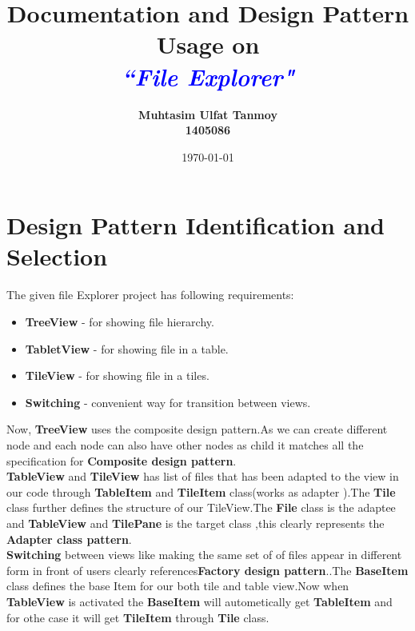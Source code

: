 \documentclass[10pt]{article}
\newcommand{\blueIt}[1]{\itshape \textcolor{blue}{#1}}
\begin{document}
\title{\bfseries \Huge Documentation and Design Pattern Usage on\\
\blueIt{``File Explorer"}}

\author{\bfseries Muhtasim Ulfat Tanmoy\\
1405086}
\date{\today}

\maketitle


\newpage

\section {Design Pattern Identification and Selection}

The given file Explorer project has following requirements:

\begin{itemize} %
 \item {\bfseries TreeView } - for showing file hierarchy.
 \item {\bfseries TabletView } - for showing file in a table.
  \item {\bfseries TileView } - for showing file in a tiles.
  \item {\bfseries Switching } - convenient way for transition between views.
 \end{itemize}
 
 Now, {\bfseries TreeView } uses the composite design pattern.As we can create different node and each node can also have other nodes as child it matches all the specification for {\bfseries Composite design pattern}.\\
 
 {\bfseries TableView } and {\bfseries TileView }  has list of files that has been adapted to the view in our code through {\bfseries TableItem} and {\bfseries TileItem} class(works as adapter ).The {\bfseries Tile} class further defines the structure of our TileView.The {\bfseries File} class is the adaptee and {\bfseries TableView } and {\bfseries TilePane } is the target class ,this clearly represents the {\bfseries Adapter class pattern}.\\
 
 
 
 {\bfseries Switching } between views like making the same set of of files appear in different form in front of users clearly references{\bfseries Factory design pattern}..The {\bfseries BaseItem } class defines the base Item for our both tile and table view.Now when {\bfseries TableView } is activated the {\bfseries BaseItem } will autometically get {\bfseries TableItem} and for othe case it will get {\bfseries TileItem} through {\bfseries Tile} class.
 \\
 
\end{document}
